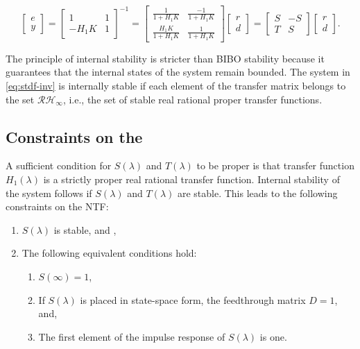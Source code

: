 \begin{equation}
	\begin{bmatrix}
		e \\
		y
	\end{bmatrix} =
	\begin{bmatrix}
		1 & 1 \\
		-H_1K & 1
	\end{bmatrix}^{-1} =
	\begin{bmatrix}
		\frac{1}{1 + H_1K} & \frac{-1}{1 + H_1K} \\
		\frac{H_1K}{1 + H_1K} & \frac{1}{1 + H_1K}
	\end{bmatrix}
	\begin{bmatrix}
		r \\
		d
	\end{bmatrix} = 
	\begin{bmatrix}
		S & -S \\
		T & S
	\end{bmatrix}
	\begin{bmatrix}
		r \\
		d
	\end{bmatrix}. \label{eq:stdf-inv}
\end{equation}

The principle of internal stability is stricter than \gls{BIBO} stability because it guarantees that the internal states of the system remain bounded. The system in \autoref{eq:stdf-inv} is internally stable if each element of the transfer matrix belongs to the set $\mathcal{R}\mathcal{H}_\infty$, i.e., the set of stable real rational proper transfer functions.

\subsection{Constraints on the }
\label{sec:model-ntf-constraints}

A sufficient condition for $S(\lambda)$ and $T(\lambda)$ to be proper is that transfer function $H_1(\lambda)$ is a strictly proper real rational transfer function. Internal stability of the system follows if $S(\lambda)$ and $T(\lambda)$ are stable. This leads to the following constraints on the \gls{NTF}:

\begin{enumerate}
	\item $S(\lambda)$ is stable, and \label{it:con-1},
	\item The following equivalent conditions hold: \label{it:con-2}
		\begin{enumerate}
			\item $S(\infty) = 1$,
			\item If $S(\lambda)$ is placed in state-space form, the feedthrough matrix $D=1$, and,
			\item The first element of the impulse response of $S(\lambda)$ is one.
		\end{enumerate}
\end{enumerate}

